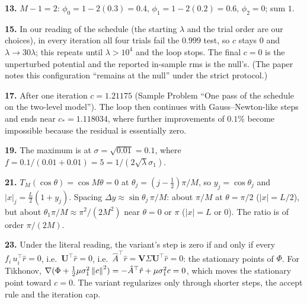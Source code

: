 \textbf{13.} $M-1=2$: $\phi_0=1-2(0.3)=0.4$, $\phi_1=1-2(0.2)=0.6$, $\phi_2=0$; sum $1$.

\textbf{15.} In our reading of the schedule (the starting $\lambda$ and the trial order are our choices), in every iteration all four trials fail the $0.999$ test, so $c$ stays $0$ and $\lambda\to30\lambda$; this repeats until $\lambda>10^4$ and the loop stops. The final $c=0$ is the unperturbed potential and the reported in-sample rms is the null's. (The paper notes this configuration ``remains at the null'' under the strict protocol.)

\textbf{17.} After one iteration $c=1.21175$ (Sample Problem ``One pass of the schedule on the two-level model''). The loop then continues with Gauss--Newton-like steps and ends near $c_*=1.118034$, where further improvements of $0.1\%$ become impossible because the residual is essentially zero.

\textbf{19.} The maximum is at $\sigma=\sqrt{0.01}=0.1$, where $f=0.1/(0.01+0.01)=5=1/(2\sqrt\lambda\sigma_1)$.

\textbf{21.} $T_M(\cos\theta)=\cos M\theta=0$ at $\theta_j=(j-\tfrac12)\pi/M$, so $y_j=\cos\theta_j$ and $|x|_j=\tfrac L2(1+y_j)$. Spacing $\Delta y\approx\sin\theta_j\,\pi/M$: about $\pi/M$ at $\theta=\pi/2$ ($|x|=L/2$), but about $\theta_1\pi/M\approx\pi^2/(2M^2)$ near $\theta=0$ or $\pi$ ($|x|=L$ or $0$). The ratio is of order $\pi/(2M)$.

\textbf{23.} Under the literal reading, the variant's step is zero if and only if every $f_i\,u_i^\top\hat r=0$, i.e.\ $\bm U^\top\hat r=0$, i.e.\ $\hat A^\top\hat r=\bm V\Sigma\bm U^\top\hat r=0$: the stationary points of $\Phi$. For Tikhonov, $\nabla(\Phi+\tfrac12\mu\sigma_1^2\left\lVert c\right\rVert^2)=-\hat A^\top\hat r+\mu\sigma_1^2c=0$, which moves the stationary point toward $c=0$. The variant regularizes only through shorter steps, the accept rule and the iteration cap.
